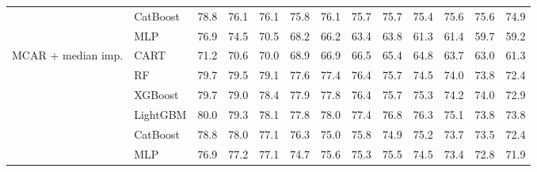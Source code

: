 \begin{table}[p]
\begin{tabular}{@{}llrrrrrrrrrrr@{}}
 & CatBoost & 78.8 & 76.1 & 76.1 & 75.8 & 76.1 & 75.7 & 75.7 & 75.4 & 75.6 & 75.6 & 74.9 \\
 & MLP & 76.9 & 74.5 & 70.5 & 68.2 & 66.2 & 63.4 & 63.8 & 61.3 & 61.4 & 59.7 & 59.2 \\
\midrule
MCAR + median imp. & CART & 71.2 & 70.6 & 70.0 & 68.9 & 66.9 & 66.5 & 65.4 & 64.8 & 63.7 & 63.0 & 61.3 \\
 & RF & 79.7 & 79.5 & 79.1 & 77.6 & 77.4 & 76.4 & 75.7 & 74.5 & 74.0 & 73.8 & 72.4 \\
 & XGBoost & 79.7 & 79.0 & 78.4 & 77.9 & 77.8 & 76.4 & 75.7 & 75.3 & 74.2 & 74.0 & 72.9 \\
 & LightGBM & 80.0 & 79.3 & 78.1 & 77.8 & 78.0 & 77.4 & 76.8 & 76.3 & 75.1 & 73.8 & 73.8 \\
 & CatBoost & 78.8 & 78.0 & 77.1 & 76.3 & 75.0 & 75.8 & 74.9 & 75.2 & 73.7 & 73.5 & 72.4 \\
 & MLP & 76.9 & 77.2 & 77.1 & 74.7 & 75.6 & 75.3 & 75.5 & 74.5 & 73.4 & 72.8 & 71.9 \\
\bottomrule
\end{tabular}
\end{table}

